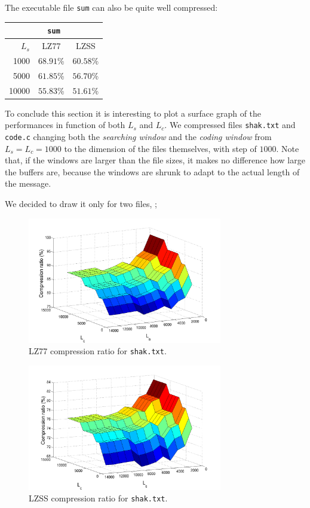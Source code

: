 The executable file \texttt{sum} can also be quite well compressed:
\begin{center}
\begin{tabular}{r | c | c |}
\multicolumn{3}{c|}{\texttt{sum}} \\ 
\hline
$L_s$ & LZ77 & LZSS \\ \hline
1000 & $68.91$\% & $60.58$\% \\
5000& $61.85$\% & $56.70$\% \\
10000& $55.83$\% & $51.61$\% \\
\hline
\end{tabular}
\end{center}

To conclude this section it is interesting to plot a surface graph of the performances in function of both $L_s$ and $L_c$. We compressed files \texttt{shak.txt} and \texttt{code.c} changing both the \textit{searching window} and the \textit{coding window} from $L_s = L_c = 1000$ to the dimension of the files themselves, with step of $1000$. Note that, if the windows are larger than the file sizes, it makes no difference how large the buffers are, because the windows are shrunk to adapt to the actual length of the message.

We decided to draw it only for two files, ; 

\begin{center}
\begin{figure}[H]
\includegraphics[width=8.5cm]{images/lz77_4.png}
\caption{LZ77 compression ratio for \texttt{shak.txt}.}
\end{figure}
\end{center}

\begin{center}
\begin{figure}[H]
\includegraphics[width=8.5cm]{images/lzss_4.png}
\caption{LZSS compression ratio for \texttt{shak.txt}.}
\end{figure}
\end{center}

